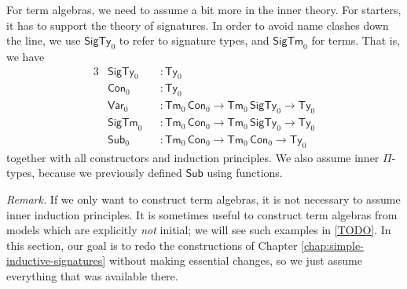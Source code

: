 \documentclass[12pt,a4paper,twoside,openany]{book}
\theoremstyle{remark}
\theoremstyle{definition}
\theoremstyle{theorem}
\newcommand{\ms}[1]{\mathsf{#1}}
\newcommand{\Con}{\mathsf{Con}}
\newcommand{\Sub}{\mathsf{Sub}}
\newcommand{\Tm}{\mathsf{Tm}}
\newcommand{\Ty}{\mathsf{Ty}}
\newcommand{\SigTy}{\mathsf{SigTy}}
\newcommand{\SigTm}{\mathsf{SigTm}}
\newcommand{\Var}{\ms{Var}}
\begin{document}
For term algebras, we need to assume a bit more in the inner theory. For
starters, it has to support the theory of signatures. In order to avoid name
clashes down the line, we use $\SigTy_0$ to refer to signature types, and
$\SigTm_0$ for terms. That is, we have
\begin{alignat*}{3}
  & \SigTy_0  &&: \Ty_0\\
  & \Con_0   &&: \Ty_0\\
  & \Var_0   &&: \Tm_0\,\Con_0 \to \Tm_0\,\SigTy_0 \to \Ty_0\\
  & \SigTm_0 &&: \Tm_0\,\Con_0 \to \Tm_0\,\SigTy_0 \to \Ty_0\\
  & \Sub_0   &&: \Tm_0\,\Con_0 \to \Tm_0\,\Con_0 \to \Ty_0
\end{alignat*}
together with all constructors and induction principles. We also assume inner
$\Pi$-types, because we previously defined $\Sub$ using functions.

\emph{Remark.} If we only want to construct term algebras, it is not necessary
to assume inner induction principles. It is sometimes useful to construct term
algebras from models which are explicitly \emph{not} initial; we will see such
examples in \ref{TODO}. In this section, our goal is to redo the constructions
of Chapter \ref{chap:simple-inductive-signatures} without making essential changes, so
we just assume everything that was available there.
\end{document}
